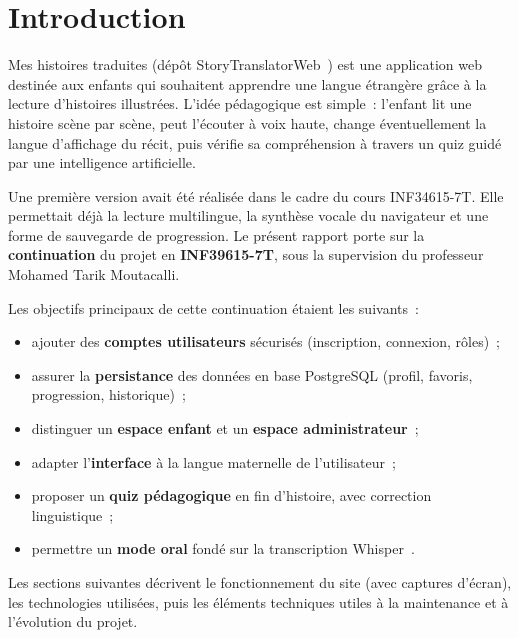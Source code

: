 \documentclass[12pt,twoside,letterpaper]{article}
\newcommand{\appname}{Mes histoires traduites}
\newcommand{\appcode}{StoryTranslatorWeb}
\begin{document}


\tableofcontents
\newpage


\section{Introduction}
\label{sec:introduction}

\appname{} (dépôt \appcode{}~\cite{ref_github_projet}) est une application web destinée aux enfants qui souhaitent apprendre une langue étrangère grâce à la lecture d'histoires illustrées.
L'idée pédagogique est simple~: l'enfant lit une histoire scène par scène, peut l'écouter à voix haute, change éventuellement la langue d'affichage du récit, puis vérifie sa compréhension à travers un quiz guidé par une intelligence artificielle.

Une première version avait été réalisée dans le cadre du cours INF34615-7T.
Elle permettait déjà la lecture multilingue, la synthèse vocale du navigateur et une forme de sauvegarde de progression.
Le présent rapport porte sur la \textbf{continuation} du projet en \textbf{INF39615-7T}, sous la supervision du professeur Mohamed Tarik Moutacalli.

Les objectifs principaux de cette continuation étaient les suivants~:
\begin{itemize}
    \item ajouter des \textbf{comptes utilisateurs} sécurisés (inscription, connexion, rôles)~;
    \item assurer la \textbf{persistance} des données en base PostgreSQL (profil, favoris, progression, historique)~;
    \item distinguer un \textbf{espace enfant} et un \textbf{espace administrateur}~;
    \item adapter l'\textbf{interface} à la langue maternelle de l'utilisateur~;
    \item proposer un \textbf{quiz pédagogique} en fin d'histoire, avec correction linguistique~;
    \item permettre un \textbf{mode oral} fondé sur la transcription Whisper~\cite{ref_whisper_paper,ref_whisper_api}.
\end{itemize}

Les sections suivantes décrivent le fonctionnement du site (avec captures d'écran), les technologies utilisées, puis les éléments techniques utiles à la maintenance et à l'évolution du projet.
\end{document}
